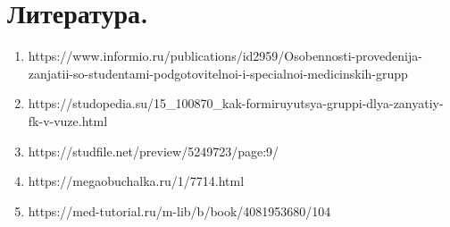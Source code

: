 \documentclass[bachelor, och, referat ]{SCWorks}
\begin{document}
\section*{Литература.}
\begin{enumerate}
\item{https://www.informio.ru/publications/id2959/Osobennosti-provedenija-zanjatii-so-studentami-podgotovitelnoi-i-specialnoi-medicinskih-grupp}
\item{https://studopedia.su/15_100870_kak-formiruyutsya-gruppi-dlya-zanyatiy-fk-v-vuze.html}
\item{https://studfile.net/preview/5249723/page:9/}
\item{https://megaobuchalka.ru/1/7714.html}
\item{https://med-tutorial.ru/m-lib/b/book/4081953680/104}
\end{enumerate}
\end{document}
